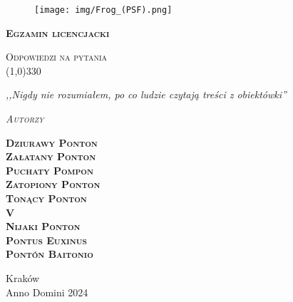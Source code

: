 \begin{titlepage} 
    \begin{center}
         \begin{figure}[H]
            \centering
            \texttt{[image: img/Frog\_(PSF).png]}
           
        \end{figure}
        
        \Huge
        \textbf{\textsc{Egzamin licencjacki}}
        
        \vspace{0.5cm}
        \Large
        \textsc{Odpowiedzi na pytania} \\ 
        \line(1,0){330}

        \normalsize
        \textit{,,Nigdy nie rozumiałem, po co ludzie czytają treści z obiektówki''}
        \vspace{1cm}

        \textit{\textsc{Autorzy}}\\
        \vspace{5mm}
  
        \textbf{\textsc{Dziurawy Ponton} \\ \textsc{Załatany Ponton} \\ \textsc{Puchaty Pompon} \\ \textsc{Zatopiony Ponton} \\ \textsc{Tonący Ponton}\\ \textsc{V} \\ \textsc{Nijaki Ponton} \\ \textsc{Pontus Euxinus} \\ \textsc{Pontón Baitonio}} 
 
        \vfill

        Kraków \\
        Anno Domini 2024
    \end{center}
\end{titlepage}
